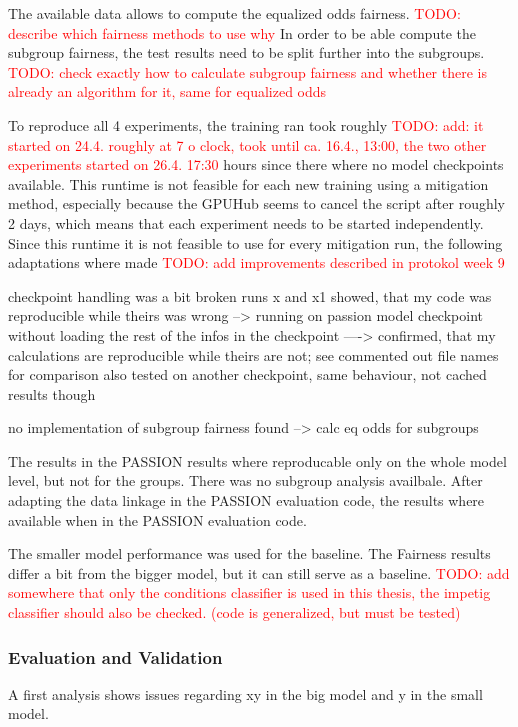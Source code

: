 \documentclass[12pt, a4paper, oneside]{book}   	%
\renewcommand{\todo}[1]{\textcolor{red}{TODO: #1}}
\renewcommand{\paragraph}[1]{%
	\subsubsection*{#1}%
}
\begin{document}
			The available data allows to compute the equalized odds fairness. \todo{describe which fairness methods to use why}
			In order to be able compute the subgroup fairness, the test results need to be split further into the subgroups. \todo{check exactly how to calculate subgroup fairness and whether there is already an algorithm for it, same for equalized odds}
			
					
			To reproduce all 4 experiments, the training ran took roughly \todo{add: it started on 24.4. roughly at 7 o clock, took until ca. 16.4., 13:00, the two other experiments started on 26.4. 17:30} hours since there where no model checkpoints available. This runtime is not feasible for each new training using a mitigation method, especially because the GPUHub seems to cancel the script after roughly 2 days, which means that each experiment needs to be started independently.
			Since this runtime it is not feasible to use for every mitigation run, the following adaptations where made \todo{add improvements described in protokol week 9}
			
			
			checkpoint handling was a bit broken
			runs x and x1 showed, that my code was reproducible while theirs was wrong
			--> running on passion model checkpoint without loading the rest of the infos in the checkpoint
			----> confirmed, that my calculations are reproducible while theirs are not; see commented out file names for comparison
			also tested on another checkpoint, same behaviour, not cached results though
			
			
			no implementation of subgroup fairness found --> calc eq odds for subgroups
			
			
			The results in the PASSION results where reproducable only on the whole model level, but not for the groups. There was no subgroup analysis availbale.
			After adapting the data linkage in the PASSION evaluation code, the results where available when in the PASSION evaluation code. 
			
			
			The smaller model performance was used for the baseline. The Fairness results differ a bit from the bigger model, but it can still serve as a baseline.
			\todo{add somewhere that only the conditions classifier is used in this thesis, the impetig classifier should also be checked. (code is generalized, but must be tested)}
		\paragraph{Evaluation and Validation}
			A first analysis shows issues regarding xy in the big model and y in the small model.
			
\end{document}
